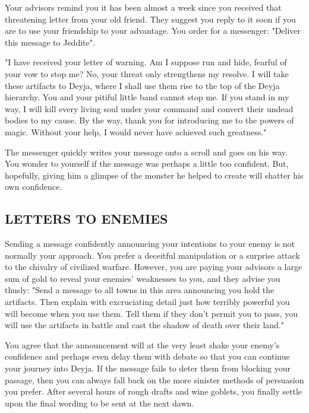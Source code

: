 \begin{multicols*}{2}
Your advisors remind you it has been almost a week since you received that threatening letter from your old friend. They suggest you reply to it soon if you are to use your friendship to your advantage. You order for a messenger: "Deliver this message to Jeddite".

\begin{itshape}
"I have received your letter of warning. Am I suppose run and hide, fearful of your vow to stop me? No, your threat only strengthens my resolve. I will take these artifacts to Deyja, where I shall use them rise to the top of the Deyja hierarchy. You and your pitiful little band cannot stop me. If you stand in my way, I will kill every living soul under your command and convert their undead bodies to my cause. By the way, thank you for introducing me to the powers of magic. Without your help, I would never have achieved such greatness."
\end{itshape}

The messenger quickly writes your message onto a scroll and goes on his way. You wonder to yourself if the message was perhaps a little too confident. But, hopefully, giving him a glimpse of the monster he helped to create will shatter his own confidence.


\subsection*{\MakeUppercase{Letters to enemies}}

Sending a message confidently announcing your intentions to your enemy is not normally your approach. You prefer a deceitful manipulation or a surprise attack to the chivalry of civilized warfare. However, you are paying your advisors a large sum of gold to reveal your enemies' weaknesses to you, and they advise you thusly: "Send a message to all towns in this area announcing you hold the artifacts. Then explain with excruciating detail just how terribly powerful you will become when you use them. Tell them if they don't permit you to pass, you will use the artifacts in battle and cast the shadow of death over their land."

You agree that the announcement will at the very least shake your enemy's confidence and perhaps even delay them with debate so that you can continue your journey into Deyja. If the message fails to deter them from blocking your passage, then you can always fall back on the more sinister methods of persuasion you prefer. After several hours of rough drafts and wine goblets, you finally settle upon the final wording to be sent at the next dawn.



\end{multicols*}
